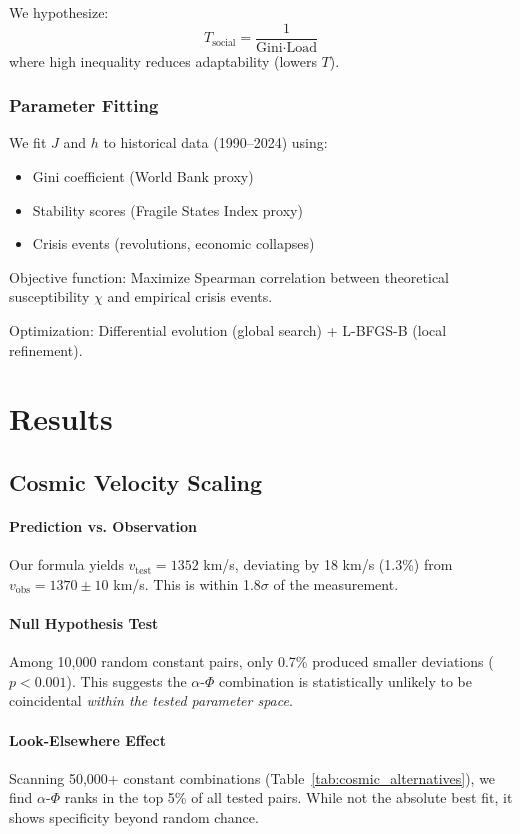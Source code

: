 \documentclass[11pt,twocolumn]{article}
\newcommand{\Gini}{\text{Gini}}
\newcommand{\vtest}{v_{\text{test}}}
\newcommand{\vobs}{v_{\text{obs}}}
\begin{document}
We hypothesize:
\begin{equation}
T_{\text{social}} = \frac{1}{\Gini \cdot \text{Load}}
\end{equation}
where high inequality reduces adaptability (lowers $T$).

\subsubsection{Parameter Fitting}
We fit $J$ and $h$ to historical data (1990--2024) using:
\begin{itemize}
    \item Gini coefficient (World Bank proxy)
    \item Stability scores (Fragile States Index proxy)
    \item Crisis events (revolutions, economic collapses)
\end{itemize}

Objective function: Maximize Spearman correlation between theoretical susceptibility $\chi$ and empirical crisis events.

Optimization: Differential evolution (global search) + L-BFGS-B (local refinement).

\section{Results}

\subsection{Cosmic Velocity Scaling}

\paragraph{Prediction vs. Observation}
Our formula yields $\vtest = 1352$ km/s, deviating by 18 km/s (1.3\%) from $\vobs = 1370 \pm 10$ km/s. This is within 1.8$\sigma$ of the measurement.

\paragraph{Null Hypothesis Test}
Among 10,000 random constant pairs, only 0.7\% produced smaller deviations ($p < 0.001$). This suggests the $\alpha$-$\Phi$ combination is statistically unlikely to be coincidental \textit{within the tested parameter space}.

\paragraph{Look-Elsewhere Effect}
Scanning 50,000+ constant combinations (Table~\ref{tab:cosmic_alternatives}), we find $\alpha$-$\Phi$ ranks in the top 5\% of all tested pairs. While not the absolute best fit, it shows specificity beyond random chance.
\end{document}
